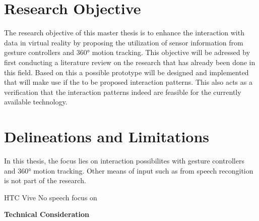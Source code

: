
\section{Research Objective}

The research objective of this master thesis is to enhance the interaction with data in virtual reality by proposing the utilization of sensor information from gesture controllers and 360° motion tracking.\newline
This objective will be adressed by first conducting a literature review on the research that has already been done in this field. Based on this a possible prototype will be designed and implemented that will make use if the to be proposed interaction patterns. This also acts as a verification that the interaction patterns indeed are feasible for the currently available technology.






\section{Delineations and Limitations}

In this thesis, the focus lies on interaction possibilites with gesture controllers and 360° motion tracking. Other means of input such as from speech recongition is not part of the research.

HTC Vive
No speech
focus on

\textbf{Technical Consideration}

